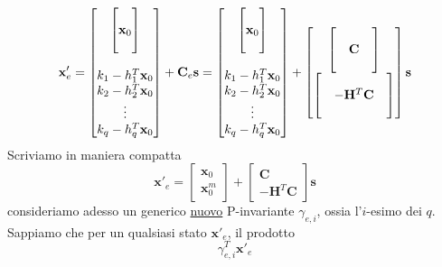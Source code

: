 \documentclass[10pt, letterpaper]{report}
\begin{document}
$$ 
\mathbf x'_e=\begin{bmatrix}
    \begin{bmatrix}
        \\ \mathbf x_0 \\ \hphantom{a}
    \end{bmatrix}\\ \\
    k_1-h_1^T\mathbf x_0\\
    k_2-h_2^T\mathbf x_0\\ \vdots \\ 
    k_q-h_q^T\mathbf x_0
\end{bmatrix}+\mathbf C_e\mathbf s=
\begin{bmatrix}
    \begin{bmatrix}
        \\ \mathbf x_0 \\ \hphantom{a}
    \end{bmatrix}\\ \\
    k_1-h_1^T\mathbf x_0\\
    k_2-h_2^T\mathbf x_0\\ \vdots \\ 
    k_q-h_q^T\mathbf x_0
\end{bmatrix}+\begin{bmatrix}
    \begin{bmatrix}
    & &  \\
    &\mathbf C & \\  
    & &
    \end{bmatrix}\\ 
    \begin{bmatrix}
        & &  \\
        &-\mathbf H^T\mathbf C & \\  
        & &
        \end{bmatrix}
\end{bmatrix}\mathbf s
$$
Scriviamo in maniera compatta 
$$ \mathbf x'_e=\begin{bmatrix}
 \mathbf x_0 \\ \mathbf x_0^m
\end{bmatrix}+\begin{bmatrix}
    \mathbf C \\ -\mathbf H^T\mathbf C
   \end{bmatrix}\mathbf s$$
consideriamo adesso un generico \underline{nuovo} P-invariante $\gamma_{e,i}$, ossia l'$i$-esimo dei $q$. Sappiamo che per un qualsiasi stato $\mathbf x'_e$, il prodotto 
$$ \gamma_{e,i}^T\mathbf x'_e$$
\end{document}
